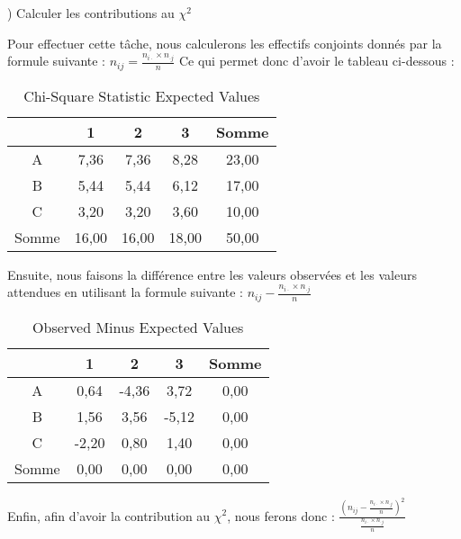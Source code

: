 	) Calculer les contributions au $\chi^2$
	
	Pour effectuer cette tâche, nous calculerons les effectifs conjoints donnés par la formule suivante : $n_{ij}=\frac{\displaystyle n_{i \cdotp} \times n_{\cdotp j}}{\displaystyle n}$ Ce qui permet donc d'avoir le tableau ci-dessous :
	
	\begin{table}[htbp]
		\centering
		\begin{tabular}{c|c|c|c|c}
			\cline{2-5}
			& 1      & 2      & 3      & Somme \\ \hline
			A      & 7,36   & 7,36   & 8,28   & 23,00 \\ \hline
			B      & 5,44   & 5,44   & 6,12   & 17,00 \\ \hline 
			C      & 3,20   & 3,20   & 3,60   & 10,00 \\ \hline
			Somme  & 16,00  & 16,00  & 18,00  & 50,00 \\ \hline
		\end{tabular}%
		\caption{Chi-Square Statistic Expected Values}
	\end{table}%
	
	Ensuite, nous faisons la différence entre les valeurs observées et les valeurs attendues en utilisant la formule suivante : $n_{ij}-\frac{\displaystyle n_{i\cdotp}\times n_{\cdotp j}}{\displaystyle n}$
	
\begin{table}[htbp]
	\centering
	
	\begin{tabular}{c|c|c|c|c}
		\cline{2-5}
		& 1      & 2      & 3      & Somme \\ \hline
		A      & 0,64   & -4,36  & 3,72   & 0,00 \\ \hline
		B      & 1,56   & 3,56   & -5,12  & 0,00 \\ \hline
		C      & -2,20  & 0,80   & 1,40   & 0,00 \\ \hline
		Somme  & 0,00   & 0,00   & 0,00   & 0,00 \\ \hline
	\end{tabular}%
	\caption{Observed Minus Expected Values}
\end{table}%

	
	Enfin, afin d'avoir la contribution au $\chi^2$, nous ferons donc : $\frac{\displaystyle \left(n_{ij}-\frac{\displaystyle n_{i\cdotp}\times n_{\cdotp j}}{n}\right)^2}{\displaystyle \frac{n_{i\cdotp}\times n_{\cdotp j}}{n}}$
	
